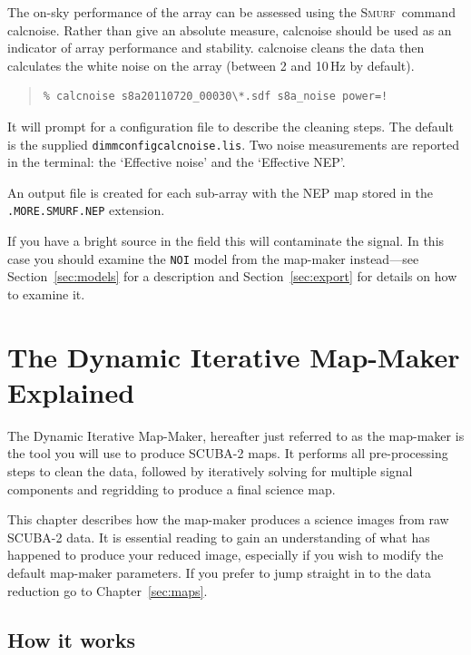 \documentclass[twoside,11pt]{article}
\newcommand{\htmlref}[2]{#1}
\newcommand{\latexhtml}[2]{#1}
\newcommand{\xref}[3]{#1}
\newcommand{\xlabel}[1]{}
\renewcommand{\_}{\texttt{\symbol{95}}}
\newenvironment{myquote}{
   \color{MidnightBlue}\begin{quote}\begin{small}}{
   \end{small}\end{quote}
}
\newcommand{\smurf}{\xref{\textsc{Smurf}}{sun258}{}}
\newcommand{\task}[1]{\textsf{#1}}
\newcommand{\file}[1]{\texttt{#1}}
\newcommand{\model}[1]{\texttt{#1}}
\newcommand{\calcnoise}{\xref{\task{calcnoise}}{sun258}{CALCNOISE}}
\newcommand{\cref}[3]{\latexhtml{#1~\ref{#2}}{\htmlref{#3}{#2}}}
\renewenvironment{myquote}{
      \begin{quote}\begin{small}}{
      \end{small}\end{quote}
   }
\begin{document}
The on-sky performance of the array can be assessed using the \smurf\
command \calcnoise. Rather than give an absolute measure, \task{calcnoise}
should be used as an indicator of array performance and stability.
\task{calcnoise} cleans the data then calculates the
white noise on the array (between 2 and 10\,Hz by default).
\begin{myquote}
\begin{verbatim}
% calcnoise s8a20110720_00030\*.sdf s8a_noise power=!
\end{verbatim}
\end{myquote}
It will prompt for a configuration file to describe the cleaning
steps. The default is the supplied \file{dimmconfig\_calcnoise.lis}.
Two noise measurements are reported in the terminal: the
`Effective noise' and the `Effective NEP'.

An output file is created for each sub-array with the NEP map stored
in the \texttt{.MORE.SMURF.NEP} extension.

If you have a bright source in the field this will
contaminate the signal. In this case you should examine the
\model{NOI} model from the map-maker instead---see
\cref{Section}{sec:models}{The individual models} for a description
and \cref{Section}{sec:export}{Exporting individual models} for
details on how to examine it.

\clearpage
\section{\xlabel{dimm}The Dynamic Iterative Map-Maker Explained}
\label{sec:dimm}

The Dynamic Iterative Map-Maker, hereafter just referred to as
the map-maker is the tool you will use to produce SCUBA-2 maps. It
performs all pre-processing steps to clean the data, followed by
iteratively solving for multiple signal components and regridding to
produce a final science map.

This chapter describes how the map-maker produces a science images
from raw SCUBA-2 data. It is essential reading to gain an
understanding of what has happened to produce your reduced image,
especially if you wish to modify the default map-maker parameters.
\color{red} If you prefer to jump straight in to the data reduction go
to \cref{Chapter}{sec:maps}{Reducing Your Data}.\color{black}


\subsection{\xlabel{dimm_theory}How it works}
\end{document}
